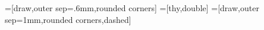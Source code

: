 %
%

=[draw,outer sep=.6mm,rounded corners]
=[thy,double]
=[draw,outer sep=1mm,rounded corners,dashed]

\usetikzlibrary{arrows}
\newcommand{\@mmtarrowtip}{angle 45}
\newcommand{\@mmtreversearrowtip}{angle 45 reversed}
\newcommand{\@mmtarrowtipepi}{triangle 45}
\newcommand{\@mmtarrowtipmonoright}{right hook}
\newcommand{\@mmtarrowtipmonoleft}{left hook}
\newcommand{\@mmtarrowtippartial}{right to}
\newcommand{\@mmtarrowtippartialleft}{left to}
\newcommand{\@mmtreversearrowtippartial}{right to reversed}
\newcommand{\@mmtreversearrowtippartialleft}{left to reversed}

